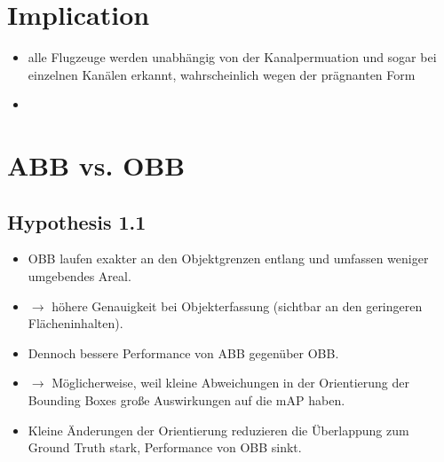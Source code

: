 \section*{Implication}
\begin{itemize}
    \item alle Flugzeuge werden unabhängig von der Kanalpermuation und sogar bei einzelnen Kanälen erkannt, wahrscheinlich wegen der prägnanten Form 
    \item 
\end{itemize}



\section{ABB vs. OBB}

\subsection*{Hypothesis 1.1}
\begin{itemize}
  \item OBB laufen exakter an den Objektgrenzen entlang und umfassen weniger umgebendes Areal.
  \item $\rightarrow$ höhere Genauigkeit bei Objekterfassung (sichtbar an den geringeren Flächeninhalten).
  \item Dennoch bessere Performance von ABB gegenüber OBB.
  \item $\rightarrow$ Möglicherweise, weil kleine Abweichungen in der Orientierung der Bounding Boxes große Auswirkungen auf die mAP haben.
  \item Kleine Änderungen der Orientierung reduzieren die Überlappung zum Ground Truth stark, Performance von OBB sinkt.
\end{itemize}

